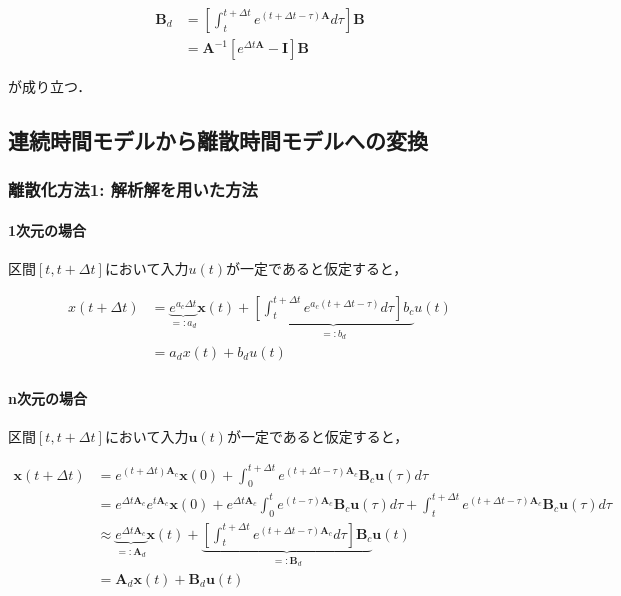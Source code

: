 \begin{align}
\mathbf{B}_d &= \left[\int_t^{t+\Delta t} e^{(t+\Delta t-\tau)\mathbf{A}} d\tau\right] \mathbf{B}\\
&=\mathbf{A}^{-1}\left[e^{\Delta t \mathbf{A}}-\mathbf{I}\right]\mathbf{B}
\end{align}


が成り立つ．

\subsection{連続時間モデルから離散時間モデルへの変換}
\subsubsection{離散化方法1: 解析解を用いた方法}
\paragraph{1次元の場合}

区間$[t, t+\Delta t]$において入力$u(t)$が一定であると仮定すると，


\begin{align}
x(t+\Delta t)&= \underbrace{e^{a_c \Delta t}}_{=: a_d}\mathbf{x}(t)+\underbrace{\left[\int_t^{t+\Delta t} e^{a_c(t+\Delta t-\tau)} d\tau\right] b_c}_{=: b_d}u(t)\\
&=a_d x(t)+b_d u(t)\\
\end{align}


\paragraph{n次元の場合}
区間$[t, t+\Delta t]$において入力$\mathbf{u}(t)$が一定であると仮定すると，


\begin{align}
\mathbf{x}(t+\Delta t)&=e^{(t+\Delta t)\mathbf{A}_c}\mathbf{x}(0)+\int_0^{t+\Delta t} e^{(t+\Delta t-\tau)\mathbf{A}_c}\mathbf{B}_c\mathbf{u}(\tau) d\tau\\
&=e^{\Delta t\mathbf{A}_c}e^{t\mathbf{A}_c}\mathbf{x}(0)+e^{\Delta t\mathbf{A}_c}\int_0^{t} e^{(t-\tau)\mathbf{A}_c}\mathbf{B}_c\mathbf{u}(\tau) d\tau + \int_t^{t+\Delta t} e^{(t+\Delta t-\tau)\mathbf{A}_c}\mathbf{B}_c\mathbf{u}(\tau) d\tau\\
&\approx \underbrace{e^{\Delta t\mathbf{A}_c}}_{=: \mathbf{A}_d}\mathbf{x}(t)+\underbrace{\left[\int_t^{t+\Delta t} e^{(t+\Delta t-\tau)\mathbf{A}_c} d\tau\right] \mathbf{B}_c}_{=: \mathbf{B}_d}\mathbf{u}(t)\\
&=\mathbf{A}_d\mathbf{x}(t)+\mathbf{B}_d\mathbf{u}(t)\\
\end{align}



